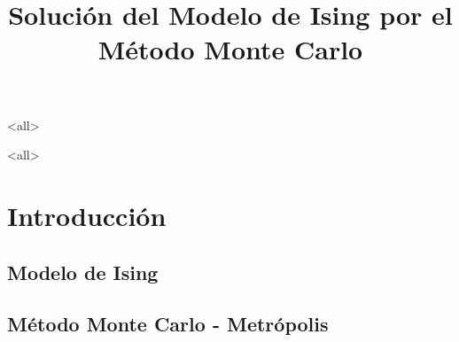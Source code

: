 \mode<all>









\title[Modelo de Ising - Monte Carlo]{
   Solución del Modelo de Ising por el Método Monte Carlo }
\subject{Modelo de Ising por el método Montecarlo}






\mode<all>

\section{Introducción}
\subsection{Modelo de Ising}

\subsection{Método Monte Carlo - Metrópolis}

%


